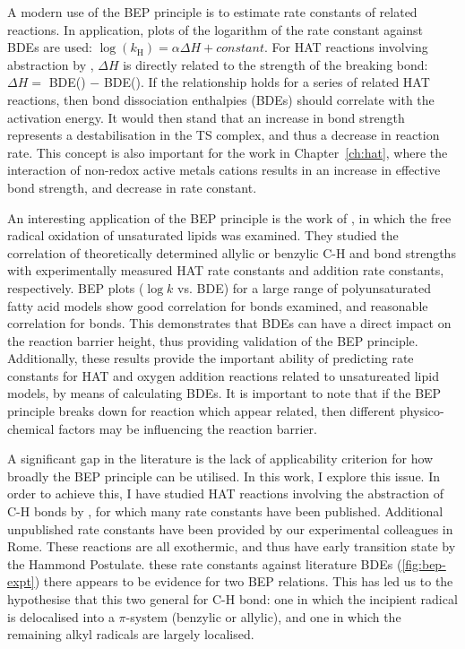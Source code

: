 A modern use of the BEP principle is to estimate rate constants of related reactions. In application, plots of the logarithm of the rate constant against BDEs are used: $\log(k_\mathrm{H}) = \alpha \Delta H + constant$. For HAT reactions involving abstraction by \cumo, $\Delta H$ is directly related to the strength of the breaking bond: $\Delta H =$ BDE() $-$ BDE(). If the relationship holds for a series of related HAT reactions, then bond dissociation enthalpies (BDEs) should correlate with the activation energy. It would then stand that an increase in bond strength represents a destabilisation in the TS complex, and thus a decrease in reaction rate. This concept is also important for the work in Chapter~\ref{ch:hat}, where the interaction of non-redox active metals cations results in an increase in effective bond strength, and decrease in rate constant.

An interesting application of the BEP principle is the work of \citet{Pratt2003}, in which the free radical oxidation of unsaturated lipids was examined. They studied the correlation of theoretically determined allylic or benzylic C-H and  bond strengths with experimentally measured HAT rate constants and  addition rate constants, respectively. BEP plots ($\log k$ vs. BDE) for a large range of polyunsaturated fatty acid models show good correlation for  bonds examined, and reasonable correlation for  bonds. This demonstrates that BDEs can have a direct impact on the reaction barrier height, thus providing validation of the BEP principle. Additionally, these results provide the important ability of predicting rate constants for HAT and oxygen addition reactions related to unsatureated lipid models, by means of calculating BDEs. It is important to note that if the BEP principle breaks down for reaction which appear related, then different physico-chemical factors may be influencing the reaction barrier.

A significant gap in the literature is the lack of applicability criterion for how broadly the BEP principle can be utilised. In this work, I explore this issue. In order to achieve this, I have studied HAT reactions involving the abstraction of C-H bonds by \cumo, for which many rate constants have been published.\cite{Bietti2010, Bietti2011, Pischel2001, Salamone2011, Salamone2012, Salamone2012a, Salamone2013, Salamone2015} Additional unpublished rate constants have been provided by our experimental colleagues in Rome. These reactions are all exothermic, and thus have early transition state by the Hammond Postulate.\cite{Russell1973}  these rate constants against literature BDEs (\ref{fig:bep-expt}) there appears to be evidence for two BEP relations. This has led us to the hypothesise that this two general for C-H bond: one in which the incipient radical is delocalised into a $\pi$-system (benzylic or allylic), and one in which the remaining alkyl radicals are largely localised.

